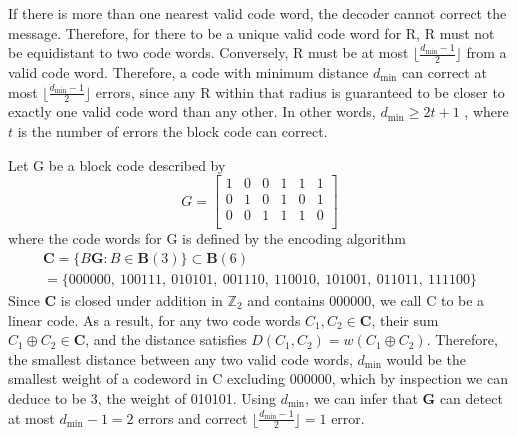 \documentclass{article}
\begin{document}
If there is more than one nearest valid code word, the decoder cannot correct the message. 
Therefore, for there to be a unique valid code word for R, R must not be equidistant to two code 
words. Conversely, R must be at most \(\lfloor\frac{d_\text{min} - 1}{2}\rfloor\) from a valid code word.
Therefore, a code with minimum distance \(d_\text{min}\) can correct at most 
\(\lfloor\frac{d_\text{min} - 1}{2}\rfloor\) errors, since any R within that radius is guaranteed to be 
closer to exactly one valid code word than any other. In other words, \(d_\text{min} \geq 2t + 1\)
\cite{bose1960class}, where \(t\) is the number of errors the block code can correct.

Let G be a block code described by
\[
G = \begin{bmatrix}
    1 & 0 & 0 & 1 & 1 & 1 \\
    0 & 1 & 0 & 1 & 0 & 1 \\
    0 & 0 & 1 & 1 & 1 & 0 \\
\end{bmatrix}
\]
where the code words for G is defined by the encoding algorithm 
\begin{gather*}
\mathbf{C} = \{B\mathbf{G} : B \in \mathbf{B}(3)\} \subset \mathbf{B}(6) \\
           = \{000000,\ 100111,\ 010101,\ 001110,\ 110010,\ 101001,\ 011011,\ 111100\}
\end{gather*}
Since \(\mathbf{C}\) is closed under addition in \(\mathbb{Z}_2\) and contains 000000, we call C to 
be a linear code. As a result, for any two code words \(C_1, C_2 \in \mathbf{C}\), their sum 
\(C_1 \oplus C_2 \in \mathbf{C}\), and the distance satisfies \(D(C_1, C_2) = w(C_1 \oplus C_2)\).
Therefore, the smallest distance between any two valid code words, \(d_\text{min}\) would be the 
smallest weight of a codeword in C excluding 000000, which by inspection we can deduce to be 3, the 
weight of 010101. Using \(d_\text{min}\), we can infer that \(\mathbf{G}\) can detect at most 
\(d_\text{min} - 1 = 2\) errors and correct \(\lfloor\frac{d_\text{min} - 1}{2}\rfloor = 1\)
error.
\end{document}
